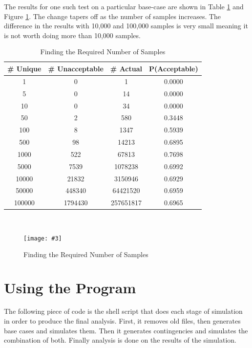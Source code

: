 \documentclass[a4paper,oneside,12pt]{report}
\newcommand{\image}[3] {
  \begin{figure}
    \begin{center}
      \texttt{[image: \#3]}
      \caption{#2}
      \label{#1}
    \end{center}
  \end{figure}
}
\begin{document}
The results for one such test on a particular base-case are shown in Table \ref{table_sample_size} and Figure \ref{imgsamplesize}. The change tapers off as the number of samples increases. The difference in
the results with 10,000 and 100,000 samples is very small meaning it is
not worth doing more than 10,000 samples.


\begin{table}[htbp]
\caption{Finding the Required Number of Samples}
\label{table_sample_size}
\centering
\begin{tabular}{c||c||c||c}
\bfseries \# Unique & \bfseries \# Unacceptable & \bfseries \# Actual & \bfseries P(Acceptable) \\
\hline \hline
1      &  0        &  1          &  0.0000  \\
5      &  0        &  14         &  0.0000  \\
10     &  0        &  34         &  0.0000  \\
50     &  2        &  580        &  0.3448  \\
100    &  8        &  1347       &  0.5939  \\
500    &  98       &  14213      &  0.6895  \\
1000   &  522      &  67813      &  0.7698  \\
5000   &  7539     &  1078238    &  0.6992  \\
10000  &  21832    &  3150946    &  0.6929  \\
50000  &  448340   &  64421520   &  0.6959  \\
100000 &  1794430  &  257651817  &  0.6965  \\
\hline
\end{tabular}\\
\end{table}

\image{imgsamplesize}{Finding the Required Number of Samples}{samplesize.png}

\section{Using the Program} \label{sec_prog_use}

The following piece of code is the shell script that does each stage of simulation in order to
produce the final analysis. First, it removes old files, then generates
base cases and simulates them. Then it generates contingencies and
simulates the combination of both. Finally analysis is done on the
results of the simulation.
\end{document}
